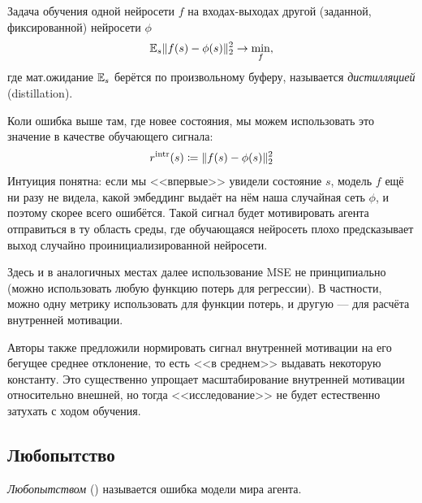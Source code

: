 \begin{definition}
Задача обучения одной нейросети $f$ на входах-выходах другой (заданной, фиксированной) нейросети $\phi$
$$\mathbb{E}_s \|f(s) - \phi(s)\|_2^2 \to \min_{f},$$
где мат.ожидание $\mathbb{E}_s$ берётся по произвольному буферу, называется \emph{дистилляцией} (distillation).
\end{definition}

Коли ошибка выше там, где новее состояния, мы можем использовать это значение в качестве обучающего сигнала:
$$r^{\mathrm{intr}}(s) \coloneqq \|f(s) - \phi(s)\|_2^2$$
Интуиция понятна: если мы <<впервые>> увидели состояние $s$, модель $f$ ещё ни разу не видела, какой эмбеддинг выдаёт на нём наша случайная сеть $\phi$, и поэтому скорее всего ошибётся. Такой сигнал будет мотивировать агента отправиться в ту область среды, где обучающаяся нейросеть плохо предсказывает выход случайно проинициализированной нейросети.

\begin{remark}
Здесь и в аналогичных местах далее использование MSE не принципиально (можно использовать любую функцию потерь для регрессии). В частности, можно одну метрику использовать для функции потерь, и другую --- для расчёта внутренней мотивации.
\end{remark}


\begin{remark}
Авторы также предложили нормировать сигнал внутренней мотивации на его бегущее среднее отклонение, то есть <<в среднем>> выдавать некоторую константу. Это существенно упрощает масштабирование внутренней мотивации относительно внешней, но тогда <<исследование>> не будет естественно затухать с ходом обучения.
\end{remark}

\subsection{Любопытство}

\begin{definition}
\emph{Любопытством} () называется ошибка модели мира агента.
\end{definition}

